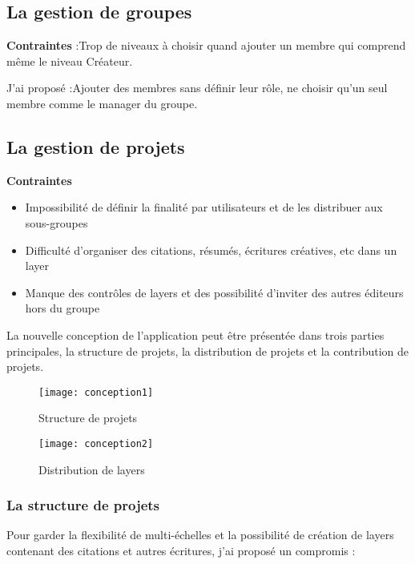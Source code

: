 \subsection{La gestion de groupes}

\textbf{Contraintes} :Trop de niveaux à choisir quand ajouter un membre qui comprend même le niveau Créateur.

J'ai proposé :Ajouter des membres sans définir leur rôle, ne choisir qu'un seul membre comme le manager du groupe.


\subsection{La gestion de projets}

\textbf{Contraintes}

\begin{itemize}
    \item Impossibilité de définir la finalité par utilisateurs et de les distribuer aux sous-groupes
    \item Difficulté d'organiser des citations, résumés, écritures créatives, etc dans un layer
    \item Manque des contrôles de layers et des possibilité d'inviter des autres éditeurs hors du groupe
\end{itemize}

La nouvelle conception de l'application peut être présentée dans trois parties principales, la structure de projets, la distribution de projets et la contribution de projets.

\begin{figure}[H]
\centering
\texttt{[image: conception1]}
\caption{Structure de projets}
\end{figure}

\begin{figure}[H]
\centering
\texttt{[image: conception2]}
\caption{Distribution de layers}
\end{figure}

\subsubsection{La structure de projets}
Pour garder la flexibilité de multi-échelles et la possibilité de création de layers contenant des citations et autres écritures, j'ai proposé un compromis :

